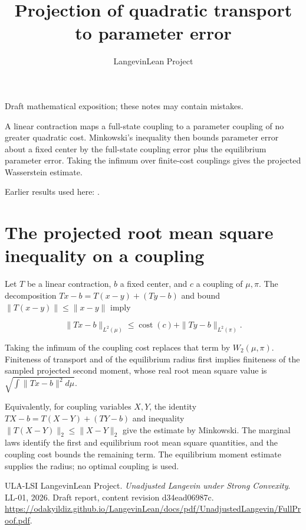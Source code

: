 \documentclass[11pt,a4paper]{article}
\title{\texorpdfstring{Projection of quadratic transport to parameter error}{Projection of quadratic transport to parameter error}}
\author{LangevinLean Project}
\date{}
\begin{document}
\maketitle
Draft mathematical exposition; these notes may contain mistakes.


A linear contraction maps a full-state coupling to a parameter coupling of no greater quadratic cost. Minkowski’s inequality then bounds parameter error about a fixed center by the full-state coupling error plus the equilibrium parameter error. Taking the infimum over finite-cost couplings gives the projected Wasserstein estimate.




Earlier results used here: \cite[Section~3.48]{LangevinLean2026ULASC}.

\section{\texorpdfstring{The projected root mean square inequality on a coupling}{The projected root mean square inequality on a coupling}}


Let \(T\) be a linear contraction, \(b\) a fixed center, and \(c\) a coupling of \(\mu,\pi\). The decomposition \(Tx-b=T(x-y)+(Ty-b)\) and bound \(\|T(x-y)\|\le\|x-y\|\) imply

\[\|Tx-b\|_{L^2(\mu)}\le\operatorname{cost}(c)+\|Ty-b\|_{L^2(\pi)}.\]

Taking the infimum of the coupling cost replaces that term by \(W_2(\mu,\pi)\). Finiteness of transport and of the equilibrium radius first implies finiteness of the sampled projected second moment, whose real root mean square value is \(\sqrt{\int\|Tx-b\|^2d\mu}\).



Equivalently, for coupling variables \(X,Y\), the identity \(TX-b=T(X-Y)+(TY-b)\) and inequality \(\|T(X-Y)\|_2\le\|X-Y\|_2\) give the estimate by Minkowski. The marginal laws identify the first and equilibrium root mean square quantities, and the coupling cost bounds the remaining term. The equilibrium moment estimate supplies the radius; no optimal coupling is used.



\begin{thebibliography}{ULA-LSI}
LangevinLean Project. \emph{Unadjusted Langevin under Strong Convexity}. LL-01, 2026. Draft report, content revision d34ead06987c. \url{https://odakyildiz.github.io/LangevinLean/docs/pdf/UnadjustedLangevin/FullProof.pdf}.
\end{thebibliography}
\end{document}
